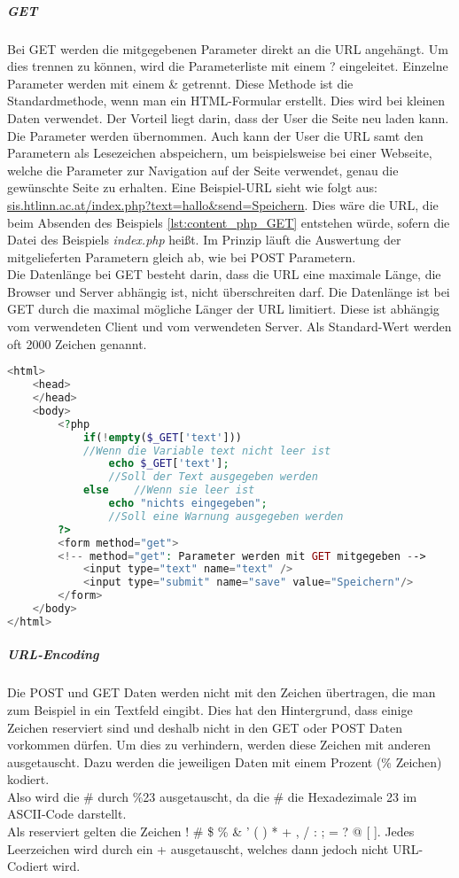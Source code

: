 \subparagraph{GET\\}
Bei GET werden die mitgegebenen Parameter direkt an die URL angehängt. Um dies trennen zu können, wird die Parameterliste mit einem ? eingeleitet. Einzelne Parameter werden mit einem \& getrennt. Diese Methode ist die Standardmethode, wenn man ein HTML-Formular erstellt. Dies wird bei kleinen Daten verwendet. Der Vorteil liegt darin, dass der User die Seite neu laden kann. Die Parameter werden übernommen. Auch kann der User die URL samt den Parametern als Lesezeichen abspeichern, um beispielsweise bei einer Webseite, welche die Parameter zur Navigation auf der Seite verwendet, genau die gewünschte Seite zu erhalten. Eine Beispiel-URL sieht wie folgt aus: \url{sis.htlinn.ac.at/index.php?text=hallo\&send=Speichern}. Dies wäre die URL, die beim Absenden des Beispiels \ref{lst:content_php_GET} entstehen würde, sofern die Datei des Beispiels \textit{index.php} heißt. Im Prinzip läuft die Auswertung der mitgelieferten Parametern gleich ab, wie bei POST Parametern.\\
Die Datenlänge bei GET besteht darin, dass die URL eine maximale Länge, die Browser und Server abhängig ist, nicht überschreiten darf.
Die Datenlänge ist bei GET durch die maximal mögliche Länger der URL limitiert. Diese ist abhängig vom verwendeten Client und vom verwendeten Server. Als Standard-Wert werden oft 2000 Zeichen genannt.
\newpage
\begin{lstlisting}[style=custom, language=PHP,  caption={Beispiel GET},label={lst:content_php_GET}]
<html>
	<head>
	</head>
	<body>
		<?php
			if(!empty($_GET['text']))	
			//Wenn die Variable text nicht leer ist
				echo $_GET['text'];	
				//Soll der Text ausgegeben werden
			else	//Wenn sie leer ist
				echo "nichts eingegeben";	
				//Soll eine Warnung ausgegeben werden
		?>
		<form method="get">	
		<!-- method="get": Parameter werden mit GET mitgegeben -->
			<input type="text" name="text" />
			<input type="submit" name="save" value="Speichern"/>
		</form>
	</body>
</html>
\end{lstlisting}
\subparagraph{URL-Encoding\\}
Die POST und GET Daten werden nicht mit den Zeichen übertragen, die man zum Beispiel in ein Textfeld eingibt. Dies hat den Hintergrund, dass einige Zeichen reserviert sind und deshalb nicht in den GET oder POST Daten vorkommen dürfen. Um dies zu verhindern, werden diese Zeichen mit anderen ausgetauscht. Dazu werden die jeweiligen Daten mit einem Prozent (\% Zeichen) kodiert.\\
Also wird die \# durch \%23 ausgetauscht, da die \# die Hexadezimale 23 im ASCII-Code darstellt.\\
Als reserviert gelten die Zeichen ! \# \$ \% \& ' ( ) * + , / : ; = ? @ [ ]. Jedes Leerzeichen wird durch ein + ausgetauscht, welches dann jedoch nicht URL-Codiert wird.
